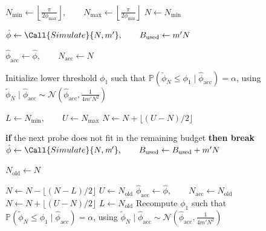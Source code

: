 \begin{algorithm}
    \caption{Simulate $\phi$ using Binary Search}
    \label{alg:binary-search}
    \begin{algorithmic}
        \State $N_\text{min} \gets \left\lfloor\frac{\pi}{2 \phi_\text{max}}\right\rfloor,
            \qquad N_\text{max} \gets \left\lfloor\frac{\pi}{2 \phi_\text{min}}\right\rfloor$
        \State $N\gets N_\text{min}$

        \State $\hat \phi \gets \Call{Simulate}{N, m'},
            \qquad B_\text{used} \gets m' N$

        \State $\hat\phi_\text{acc} \gets \hat\phi,\qquad N_\text{acc} \gets N$ 

        \State Initialize lower threshold $\phi_1$ such that $\mathbb{P}\!\left(\tilde\phi_N \leq \phi_1 \mid \hat\phi_\text{acc}\right)=\alpha$, using $\tilde\phi_N \mid \hat\phi_\text{acc} \sim \mathcal{N}\!\left(\hat\phi_\text{acc}, \tfrac{1}{4m'N^2}\right)$
        \State

        \State $L \gets N_\text{min},\qquad U \gets N_\text{max}$ 
        \State $N \gets N + \lfloor (U-N)/2 \rfloor$ 

        \Do
        \State \textbf{if} the next probe does not fit in the remaining budget \textbf{then break}
        \State $\hat \phi \gets \Call{Simulate}{N, \textit{m}'},
            \qquad B_\text{used} \gets B_\text{used} + m' N$


        \State $N_\text{old} \gets N$ 

        \State $N \gets N - \lfloor (N - L)/2 \rfloor$ 
        \State $U \gets N_\text{old}$ 
        \Else
        \State $\hat\phi_\text{acc} \gets \hat\phi, \qquad N_\text{acc} \gets N_\text{old}$ 
        \State $N \gets N + \lfloor (U - N) / 2 \rfloor$ 
        \State $L \gets N_\text{old}$ 
                \State
                \State Recompute $\phi_1$ such that $\mathbb{P}\!\left(\tilde\phi_N \leq \phi_1 \mid \hat\phi_\text{acc}\right)=\alpha$, using $\tilde\phi_N \mid \hat\phi_\text{acc} \sim \mathcal{N}\!\left(\hat\phi_\text{acc}, \tfrac{1}{4m'N^2}\right)$
        \EndIf


\end{algorithmic}
\end{algorithm}

